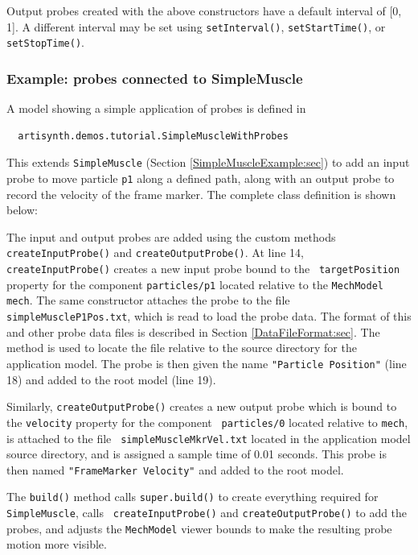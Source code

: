 Output probes created with the above constructors have a default
interval of [0, 1]. A different interval may be set using
{\tt setInterval()}, {\tt setStartTime()}, or {\tt setStopTime()}.

\subsubsection{Example: probes connected to SimpleMuscle}
\label{SimpleMuscleWithProbes:sec}

A model showing a simple application of probes is defined in
%
\begin{verbatim}
  artisynth.demos.tutorial.SimpleMuscleWithProbes
\end{verbatim}
%
This extends {\tt SimpleMuscle} (Section
\ref{SimpleMuscleExample:sec}) to add an input probe to move particle
{\tt p1} along a defined path, along with an output probe to record
the velocity of the frame marker.  The complete class definition is
shown below:
%
\lstset{numbers=left}

\lstset{numbers=none}
%
The input and output probes are added using the custom methods {\tt
createInputProbe()} and {\tt createOutputProbe()}. At line 14, {\tt
createInputProbe()} creates a new input probe bound to the {\tt
targetPosition} property for the component {\tt particles/p1} located
relative to the {\tt MechModel} {\tt mech}. The same constructor
attaches the probe to the file\\ {\tt simpleMuscleP1Pos.txt}, which is
read to load the probe data. The format of this and other probe data
files is described in Section \ref{DataFileFormat:sec}.  The method
is used to locate the file relative to the source directory for the
application model. The probe is then given the name {\tt "Particle
Position"} (line 18) and added to the root model (line 19).

Similarly, {\tt createOutputProbe()} creates a new output probe which
is bound to the {\tt velocity} property for the component {\tt
particles/0} located relative to {\tt mech}, is attached to the file {\tt
simpleMuscleMkrVel.txt} located in the application model source
directory, and is assigned a sample time of 0.01 seconds. This probe is
then named {\tt "FrameMarker Velocity"} and added to the root model.

The {\tt build()} method calls {\tt super.build()} to create
everything required for {\tt SimpleMuscle}, calls {\tt
createInputProbe()} and {\tt createOutputProbe()} to add the probes,
and adjusts the {\tt MechModel} viewer bounds to make the resulting
probe motion more visible.

